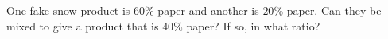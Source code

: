 One fake-snow product is $60\%$ paper and another is $20\%$ paper. Can they be mixed to give a product that is $40\%$ paper? If so, in what ratio?
